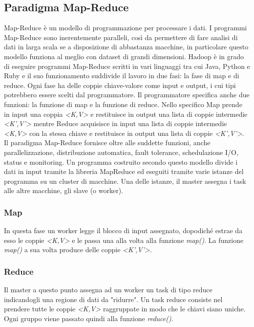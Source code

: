 \subsection{Paradigma Map-Reduce}
Map-Reduce è un modello di programmazione per processare i dati. I programmi Map-Reduce sono inerentemente paralleli, così da permettere di fare analisi di dati in larga scala se a disposizione di abbastanza macchine, in particolare questo modello funziona al meglio con dataset di grandi dimensioni. Hadoop è in grado di eseguire programmi Map-Reduce scritti in vari linguaggi tra cui Java, Python e Ruby e il suo funzionamento suddivide il lavoro in due fasi: la fase di map e di reduce. Ogni fase ha delle coppie chiave-valore come input e output, i cui tipi potrebbero essere scelti dal programmatore. Il programmatore specifica anche due funzioni: la funzione di map e la funzione di reduce. Nello specifico Map prende in input una coppia \textit{<K,V>} e restituisce in output una lista di coppie intermedie \textit{<K',V'>} mentre Reduce acquisisce in input una lista di coppie intermedie \textit{<K,V> } con la stessa chiave e restituisce in output una lista di coppie \textit{<K',V'>}. Il paradigma Map-Reduce fornisce oltre alle suddette funzioni, anche parallelizzazione, distribuzione automatica, fault tolerance, schedulazione I/O, status e monitoring. Un programma costruito secondo questo modello divide i dati in input tramite la libreria MapReduce ed eseguiti tramite varie istanze del programma su un cluster di macchine. Una delle istanze, il master assegna i task alle altre macchine, gli slave (o worker).
\subsubsection{Map}
In questa fase un worker legge il blocco di input assegnato, dopodiché estrae da esso le coppie \textit{<K,V>} e le passa una alla volta alla funzione \textit{map()}. La funzione \textit{map()} a sua volta produce delle coppie \textit{<K',V'>}.
\subsubsection{Reduce}
Il master a questo punto assegna ad un worker un task di tipo reduce indicandogli una regione di dati da "ridurre". Un task reduce consiste nel prendere tutte le coppie \textit{<K,V>} raggruppate in modo che le chiavi siano uniche. Ogni gruppo viene passato quindi alla funzione \textit{reduce()}.
